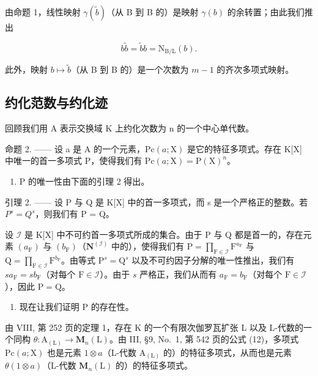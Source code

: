 由命题 1，线性映射 \(\gamma (\widetilde{b})\)（从 B 到 B 的）是映射 \(\gamma (b)\) 的余转置；由此我们推出

\[
b \widetilde {b} = \widetilde {b} b = \mathrm{N} _ {\mathrm{B/L}} (b).\tag{18}
\]

此外，映射 \(b \mapsto \widetilde{b}\)（从 B 到 B 的）是一个次数为 \(m - 1\) 的齐次多项式映射。

\subsection{约化范数与约化迹}

回顾我们用 A 表示交换域 K 上约化次数为 n 的一个中心单代数。

命题 2. —— 设 a 是 A 的一个元素，\(\mathrm{Pc}(a;\mathrm{X})\) 是它的特征多项式。存在 K{[}X{]} 中唯一的首一多项式 P，使得我们有 \(\mathrm{Pc}(a;\mathrm{X})=\mathrm{P}(\mathrm{X})^{n}\)。

\begin{enumerate}
\def\labelenumi{\Alph{enumi})}
\tightlist
\item
  P 的唯一性由下面的引理 2 得出。
\end{enumerate}

引理 2. —— 设 P 与 Q 是 K{[}X{]} 中的首一多项式，而 s 是一个严格正的整数。若 \(P^{s} = Q^{s}\)，则我们有 P = Q。

设 \(\mathcal{I}\) 是 K{[}X{]} 中不可约首一多项式所成的集合。由于 P 与 Q 都是首一的，存在元素 \((a_{\mathrm{F}})\) 与 \((b_{\mathrm{F}})\)（\(\mathbf{N}^{(\mathcal{I})}\) 中的），使得我们有 \(\mathrm{P} = \prod_{\mathrm{F} \in \mathcal{I}} \mathrm{F}^{a_{\mathrm{F}}}\) 与 \(\mathrm{Q} = \prod_{\mathrm{F} \in \mathcal{I}} \mathrm{F}^{b_{\mathrm{F}}}\)。由等式 \(\mathrm{P}^s = \mathrm{Q}^s\) 以及不可约因子分解的唯一性推出，我们有 \(sa_{\mathrm{F}} = sb_{\mathrm{F}}\)（对每个 \(\mathrm{F} \in \mathcal{I}\)）。由于 \(s\) 严格正，我们从而有 \(a_{\mathrm{F}} = b_{\mathrm{F}}\)（对每个 \(\mathrm{F} \in \mathcal{I}\)），因此 \(\mathrm{P} = \mathrm{Q}\)。

\begin{enumerate}
\def\labelenumi{\Alph{enumi})}
\setcounter{enumi}{1}
\tightlist
\item
  现在让我们证明 P 的存在性。
\end{enumerate}

由 VIII, 第 252 页的定理 1，存在 K 的一个有限次伽罗瓦扩张 L 以及 L-代数的一个同构 \(\theta : \mathrm{A}_{(\mathrm{L})} \to \mathbf{M}_n(\mathrm{L})\)。由 III, §9, No.~1, 第 542 页的公式 (12)，多项式 \(\mathrm{Pc}(a; \mathrm{X})\) 也是元素 \(1 \otimes a\)（L-代数 \(\mathrm{A}_{(\mathrm{L})}\) 的）的特征多项式，从而也是元素 \(\theta(1 \otimes a)\)（L-代数 \(\mathbf{M}_n(\mathrm{L})\) 的）的特征多项式。

